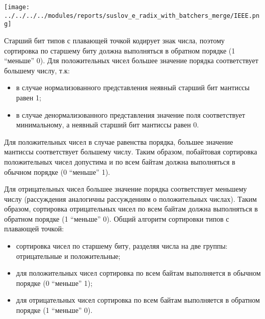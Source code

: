 \documentclass{article}
\begin{document}
\begin{center}
\texttt{[image: ../../../../modules/reports/suslov\_e\_radix\_with\_batchers\_merge/IEEE.png]}
\label{visina1}
\end{center}

Старший бит типов с плавающей точкой кодирует знак числа, поэтому сортировка по старшему биту должна выполняться в обратном порядке (1 “меньше” 0). Для положительных чисел большее значение порядка соответствует большему числу, т.к:
\begin{itemize}
\item в случае нормализованного представления неявный старший бит мантиссы равен 1;
\item в случае денормализованного представления значение поля соответствует минимальному, а неявный старший бит мантиссы равен 0.
\end{itemize}
\par Для положительных чисел в случае равенства порядка, большее значение мантиссы соответствует большему числу. Таким образом, побайтовая сортировка положительных чисел допустима и по всем байтам должна выполняться в обычном порядке (0 “меньше” 1).
\par Для отрицательных чисел большее значение порядка соответствует меньшему числу (рассуждения аналогичны рассуждениям о положительных числах). Таким образом, сортировка отрицательных чисел по всем байтам должна выполняться в обратном порядке (1 “меньше” 0).
Общий алгоритм сортировки типов с плавающей точкой:
\begin{itemize}
\item сортировка чисел по старшему биту, разделяя числа на две группы: отрицательные и положительные;
\item для положительных чисел сортировка по всем байтам выполняется в обычном порядке (0 “меньше” 1);
\item для отрицательных чисел сортировка по всем байтам выполняется в обратном порядке (1 “меньше” 0).
\end{itemize}
\end{document}
